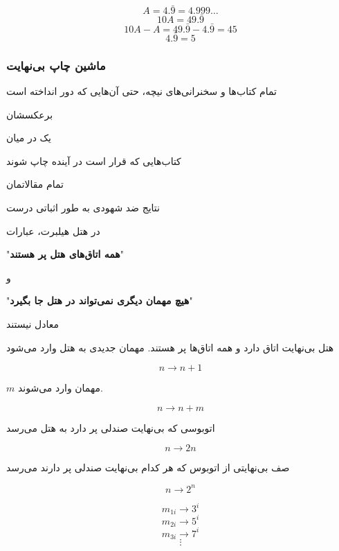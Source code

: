 \documentclass[professionalfont]{beamer}
\begin{document}
\begin{frame}
\centering
{\Huge
$$A=4.\bar{9}=4.999\dots$$
\pause
$$ 10A=49.\bar{9}$$
\pause
$$10A-A=49.\bar{9}-4.\bar{9}=45$$
\pause
$$4.\bar{9}=5$$
}
\end{frame}
\begin{frame}
\frametitle{ماشین چاپ بی‌نهایت}
{\Large
تمام کتاب‌ها و سخنرانی‌های نیچه، حتی آن‌هایی که دور انداخته است

برعکسشان

یک در میان


کتاب‌هایی که قرار است در آینده چاپ شوند

تمام مقالاتمان
}
\end{frame}
\begin{frame}

{\huge نتایج ضد شهودی به طور اثباتی درست}

\pause
\begin{block}{}
{\LARGE در هتل هیلبرت، عبارات
\begin{center}
"\textbf{همه اتاق‌های هتل پر هستند}"
\end{center}
و
\begin{center}
"\textbf{هیچ مهمان دیگری نمی‌تواند در هتل جا بگیرد}"
\end{center}
معادل نیستند}
\end{block}
\end{frame}
\begin{frame}

{\LARGE هتل بی‌نهایت اتاق دارد و همه اتاق‌ها پر هستند. مهمان جدیدی به هتل وارد می‌شود
\begin{block}{}
$$n \longrightarrow n+1$$
\end{block}
\pause
$m$
مهمان وارد می‌شوند.
\begin{block}{}
$$n \longrightarrow n+m$$
\end{block}
}
\end{frame}
\begin{frame}

{\Large
اتوبوسی که بی‌نهایت صندلی پر دارد به هتل می‌رسد

\begin{block}{}
$$ n \longrightarrow 2n$$
\end{block}

\pause
صف بی‌نهایتی از اتوبوس که هر کدام بی‌نهایت صندلی پر دارند می‌رسد
\begin{block}{}
$$ n \longrightarrow 2^n$$
\end{block}
\begin{block}{}
$$m_{1i} \longrightarrow 3^i$$
$$ m_{2i} \longrightarrow 5^i$$
$$ m_{3i} \longrightarrow 7^i$$
$$\vdots$$
\end{block}
}
\end{frame}
\end{document}
